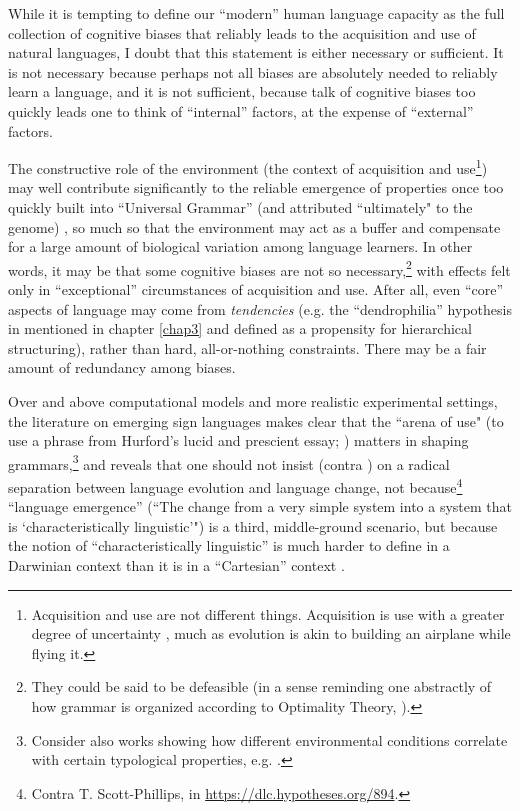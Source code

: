 While it is tempting to define our ``modern'' human language capacity as the full collection of cognitive biases that reliably leads to the acquisition and use of natural languages, I doubt that this statement is either necessary or sufficient. It is not necessary because perhaps not all biases are absolutely needed to reliably learn a language, and it is not sufficient, because talk of cognitive biases too quickly leads one to think of ``internal'' factors, at the expense of ``external'' factors.

The constructive role of the environment (the context of acquisition and use\footnote{Acquisition and use are not different things. Acquisition is use with a greater degree of uncertainty \citep{mccauley2019language}, much as evolution is akin to building an airplane while flying it.}) may well contribute significantly to the reliable emergence of properties once too quickly built into ``Universal Grammar'' (and attributed ``ultimately" to the genome) \citep{kirby2017culture,raviv2020language}, so much so that the environment may act as a buffer and compensate for a large amount of biological variation among language learners. In other words, it may be that some cognitive biases are not so necessary,\footnote{They could be said to be defeasible (in a sense reminding one abstractly of how grammar is organized according to Optimality Theory, \cite{smolensky1993optimality}).} with effects felt only in ``exceptional'' circumstances of acquisition and use. After all, even ``core'' aspects of language may come from \textit{tendencies} (e.g. the ``dendrophilia'' hypothesis in \cite{fitch2014toward} mentioned in chapter \ref{chap3} and defined as a propensity for hierarchical structuring), rather than hard, all-or-nothing constraints. There may be a fair amount of redundancy among biases.

Over and above computational models and more realistic experimental settings, the literature on emerging sign languages makes clear that the ``arena of use" (to use a phrase from Hurford's lucid and prescient essay; \cite{hurford1990nativist}) matters in shaping grammars,\footnote{Consider also works showing how different environmental conditions correlate with certain typological properties, e.g. \cite{everett2015climate}.} and reveals that one should not insist (contra \cite{mendivil2019did}) on a radical separation between language evolution and language change, not because\footnote{Contra T. Scott-Phillips, in \url{https://dlc.hypotheses.org/894}.} ``language emergence'' (``The change from a very simple system into a system that is `characteristically linguistic'{}") is a third, mid\-dle-ground scenario, but because the notion of ``characteristically linguistic'' is much harder to define in a Darwinian context than it is in a ``Cartesian'' context \citep{chomsky2009cartesian}.

